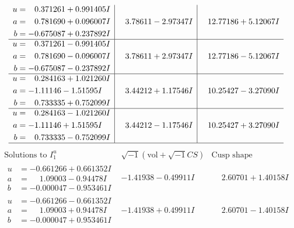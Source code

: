 \documentclass[1p]{elsarticle_modified}
\theoremstyle{definition}
\newcommand{\I}{\sqrt{-1}}
\begin{document}
$$\begin{array}{c|c|c}
\begin{aligned}
u &= \phantom{-}0.371261 + 0.991405 I \\
a &= \phantom{-}0.781690 + 0.096007 I \\
b &= -0.675087 + 0.237892 I\end{aligned}
 & \phantom{-}3.78611 - 2.97347 I & \phantom{-}12.77186 + 5.12067 I \\ \hline\begin{aligned}
u &= \phantom{-}0.371261 - 0.991405 I \\
a &= \phantom{-}0.781690 - 0.096007 I \\
b &= -0.675087 - 0.237892 I\end{aligned}
 & \phantom{-}3.78611 + 2.97347 I & \phantom{-}12.77186 - 5.12067 I \\ \hline\begin{aligned}
u &= \phantom{-}0.284163 + 1.021260 I \\
a &= -1.11146 - 1.51595 I \\
b &= \phantom{-}0.733335 + 0.752099 I\end{aligned}
 & \phantom{-}3.44212 + 1.17546 I & \phantom{-}10.25427 - 3.27090 I \\ \hline\begin{aligned}
u &= \phantom{-}0.284163 - 1.021260 I \\
a &= -1.11146 + 1.51595 I \\
b &= \phantom{-}0.733335 - 0.752099 I\end{aligned}
 & \phantom{-}3.44212 - 1.17546 I & \phantom{-}10.25427 + 3.27090 I\\
 \hline 
 \end{array}$$\newpage$$\begin{array}{c|c|c}  
\text{Solutions to }I^u_{1}& \I (\text{vol} + \sqrt{-1}CS) & \text{Cusp shape}\\
 \hline 
\begin{aligned}
u &= -0.661266 + 0.661352 I \\
a &= \phantom{-}1.09003 - 0.94478 I \\
b &= -0.000047 - 0.953461 I\end{aligned}
 & -1.41938 - 0.49911 I & \phantom{-}2.60701 + 1.40158 I \\ \hline\begin{aligned}
u &= -0.661266 - 0.661352 I \\
a &= \phantom{-}1.09003 + 0.94478 I \\
b &= -0.000047 + 0.953461 I\end{aligned}
 & -1.41938 + 0.49911 I & \phantom{-}2.60701 - 1.40158 I \\ \hline\begin{aligned}

\end{aligned}
\end{array}$$
\end{document}
